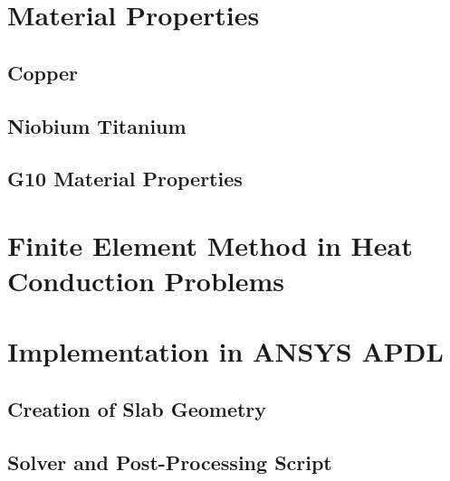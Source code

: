 \documentclass[11pt,a4paper]{report}
\begin{document}
\clearpage
\begin{appendices}

\chapter{Material Properties}
\label{appendix_material_properties_description}


\section{Copper}
\label{appendix:cu_material_properties}


\section{Niobium Titanium}
\label{appendix:nbti_material_properties}


\section{G10 Material Properties}
\label{appendix:g10_material_properties}


\clearpage
\chapter{Finite Element Method in Heat Conduction Problems}
\label{appendix:fem_heat_conduction}


\clearpage
\chapter{Implementation in ANSYS APDL}
\section{Creation of Slab Geometry}
\label{appendix:apdl_slab_geometry}


\section{Solver and Post-Processing Script}
\label{appendix:apdl_solver}



\end{appendices}
\end{document}

